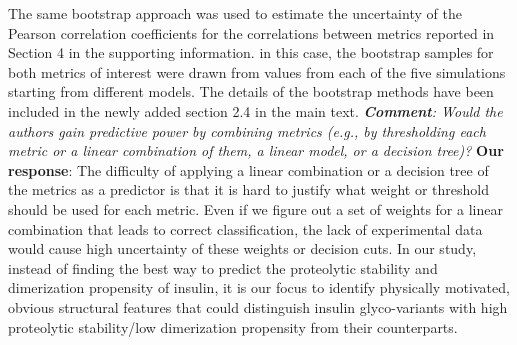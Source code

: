 \documentclass[9pt]{elife}
\begin{document}
The same bootstrap approach was used to estimate the uncertainty of the Pearson correlation coefficients for the correlations between metrics reported in Section 4 in the supporting information. in this case, the bootstrap samples for both metrics of interest were drawn from values from each of the five simulations starting from different models. The details of the bootstrap methods have been included in the newly added section 2.4 in the main text. 
\newline
\newline
\indent
\textit{\textbf{Comment}:
Would the authors gain predictive power by combining metrics (e.g., by thresholding each metric or a linear combination of them, a linear model, or a decision tree)? }
\newline
\indent 
{\bf Our response}: 
The difficulty of applying a linear combination or a decision tree of the metrics as a predictor is that it is hard to justify what weight or threshold should be used for each metric. Even if we figure out a set of weights for a linear combination that leads to correct classification, the lack of experimental data would cause high uncertainty of these weights or decision cuts. In our study, instead of finding the best way to predict the proteolytic stability and dimerization propensity of insulin, it is our focus to identify physically motivated, obvious structural features that could distinguish insulin glyco-variants with high proteolytic stability/low dimerization propensity from their counterparts. 
\end{document}
